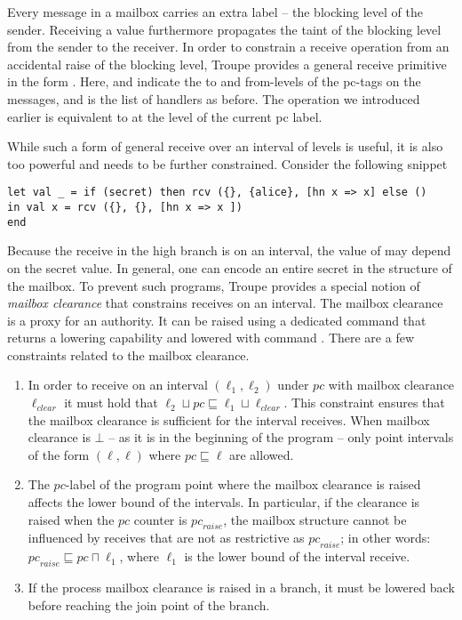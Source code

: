 Every message in a mailbox carries an extra label -- the blocking level of the sender.
Receiving a value furthermore propagates the taint of the blocking level from the sender to the receiver. 
In order to constrain a receive operation from an accidental raise of the blocking level, Troupe
provides a general receive primitive in the form 
. Here,  and 
indicate the to and from-levels of the pc-tags on the messages, and  is the list of 
handlers as before.
The  operation we introduced earlier is equivalent to 
at the level of the current pc label.

While such a form of general receive over an interval of levels is useful, it is also too powerful 
and needs to be further constrained. Consider the following snippet


\begin{lstlisting}
let val _ = if (secret) then rcv ({}, {alice}, [hn x => x] else ()
in val x = rcv ({}, {}, [hn x => x ])
end
\end{lstlisting}

Because the receive in the high branch is on an interval, the value of  may 
depend on the secret value. In general, one can encode an entire secret in the structure 
of the mailbox. To prevent such programs, Troupe provides a special notion of \emph{mailbox clearance}
that constrains receives on an interval. The mailbox clearance is a proxy for an authority. 
It can be raised using a dedicated command  that returns a lowering
capability and lowered with command . 
There are a few constraints related to the mailbox clearance.

\begin{enumerate}
    \item In order to receive on an interval $(\ell_1, \ell_2)$ under $\mathit{pc}$ 
    with mailbox clearance $\ell_{\mathit{clear}}$ it must hold that $\ell_2 \sqcup \mathit{pc} \sqsubseteq \ell_1 \sqcup \ell_{\mathit{clear}}$. 
    This constraint ensures that the mailbox clearance is sufficient for the interval receives. When mailbox clearance is $\bot$ -- as it is in the beginning of the program -- only point intervals of the form $(\ell, \ell)$ where $\mathit{pc} \sqsubseteq \ell$ are allowed.

    \item The $\mathit{pc}$-label of the program point where the mailbox clearance is raised affects the lower bound of the intervals. In particular, if the clearance is raised when the $\mathit{pc}$ counter is $\mathit{pc}_{\mathit{raise}}$, the mailbox structure cannot be influenced by receives that are not as restrictive as $\mathit{pc}_{\mathit{raise}}$; in other words: $ \mathit{pc}_\mathit{raise} \sqsubseteq \mathit{pc} \sqcap \ell_1$, where $\ell_1$ is the lower bound of the interval receive. 
    \item If the process mailbox clearance is raised in a branch, it must be lowered back before reaching the join point of the branch.
\end{enumerate}




